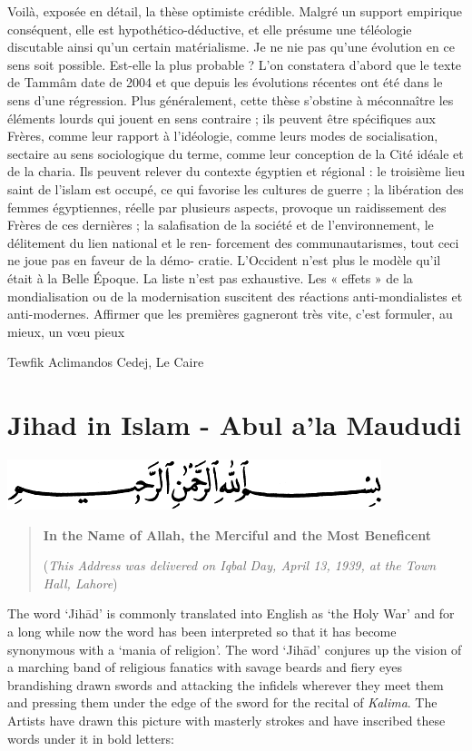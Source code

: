 Voilà, exposée en détail, la thèse optimiste crédible. Malgré un support
empirique conséquent, elle est hypothético-déductive, et elle présume
une téléologie discutable ainsi qu'un certain matérialisme. Je ne nie
pas qu'une évolution en ce sens soit possible. Est-elle la plus probable
? L'on constatera d'abord que le texte de Tammâm date de 2004 et que
depuis les évolutions récentes ont été dans le sens d'une régression.
Plus généralement, cette thèse s'obstine à méconnaître les éléments
lourds qui jouent en sens contraire ; ils peuvent être spécifiques aux
Frères, comme leur rapport à l'idéologie, comme leurs modes de
socialisation, sectaire au sens sociologique du terme, comme leur
conception de la Cité idéale et de la charia. Ils peuvent relever du
contexte égyptien et régional : le troisième lieu saint de l'islam est
occupé, ce qui favorise les cultures de guerre ; la libération des
femmes égyptiennes, réelle par plusieurs aspects, provoque un
raidissement des Frères de ces dernières ; la salafisation de la société
et de l'environnement, le délitement du lien national et le ren-
forcement des communautarismes, tout ceci ne joue pas en faveur de la
démo- cratie. L'Occident n'est plus le modèle qu'il était à la Belle
Époque. La liste n'est pas exhaustive. Les « effets » de la
mondialisation ou de la modernisation suscitent des réactions
anti-mondialistes et anti-modernes. Affirmer que les premières gagneront
très vite, c'est formuler, au mieux, un vœu pieux 

Tewfik Aclimandos Cedej, Le Caire

\section{Jihad in Islam - Abul a'la Maududi}
 \includegraphics[width=\textwidth]{CourantsIslamContemporain/ImagesCourantsIslamContemporain/image4.png}
 



\begin{quote}
\textbf{In the Name of Allah, the Merciful and the Most Beneficent}

(\emph{This Address was delivered on Iqbal Day, April 13, 1939, at the
Town Hall, Lahore})
\end{quote}

The word `Jihād' is commonly translated into English as `the Holy War'
and for a long while now the word has been interpreted so that it has
become synonymous with a `mania of religion'. The word `Jihād' conjures
up the vision of a marching band of religious fanatics with savage
beards and fiery eyes brandishing drawn swords and attacking the
infidels wherever they meet them and pressing them under the edge of the
sword for the recital of \emph{Kalima}. The Artists have drawn this
picture with masterly strokes and have inscribed these words under it in
bold letters:

